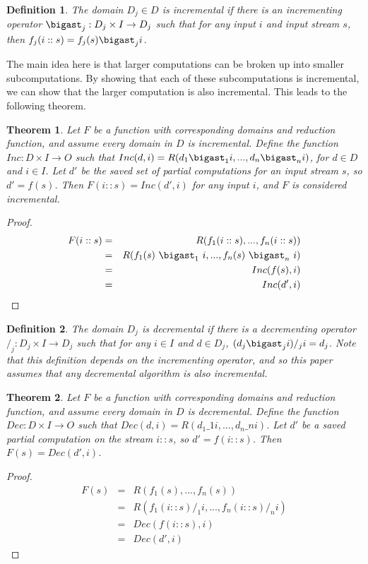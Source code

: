 \documentclass[30pt]{article}
\newtheorem{thm}{Theorem}[section]
\newtheorem{define}{Definition}[section]
\begin{document}
\begin{define}
The domain $D_j \in D$ is \emph{incremental} if there is an incrementing operator $\bigast _j : D_j \times I \rightarrow D_j$ such that for any input $i$ and input stream $s$, then $f_j(i::s) = f_j(s) \bigast_j i$.\\
\end{define}

\indent The main idea here is that larger computations can be broken up into smaller subcomputations. By showing that each of these subcomputations is incremental, we can show that the larger computation is also incremental. This leads to the following theorem. \\

\begin{thm}
Let $F$ be a function with corresponding domains and reduction function, and assume every domain in $D$ is incremental. Define the function $Inc: D \times I \rightarrow O$ such that $Inc(d, i) = R(d_1 \bigast_1 i, ..., d_n \bigast_n i) $, for $d \in D$ and $i \in I$. Let $d'$ be the saved set of partial computations for an input stream $s$, so $d' = f(s)$. Then $F(i::s) = Inc(d', i)$ for any input $i$, and $F$ is considered \emph{incremental}.
\end{thm}
\begin{proof}
\begin{eqnarray*}
F(i::s) & = & R(f_1(i::s), ..., f_n(i::s))\\
& = & R(f_1(s) \mbox{ $\bigast_1$ }  i, ..., f_n(s) \mbox{ $\bigast_n$ } i) \\
& = & Inc(f(s), i)\\
& = & Inc(d', i)
\end{eqnarray*}
\end{proof}


\begin{define}
 The domain $D_j$ is \emph{decremental} if there is a decrementing operator $/_j : D_j \times I \rightarrow D_j $ such that for any $i \in I$ and $d \in D_j$, $(d_j \bigast_j i) /_j i = d_j$. Note that this definition depends on the incrementing operator, and so this paper assumes that any decremental algorithm is also incremental. \\
\end{define}

\begin{thm}
Let $F$ be a function with corresponding domains and reduction function, and assume every domain in $D$ is decremental. Define the function $Dec: D \times I \rightarrow O$ such that $Dec(d, i) = R(d_1 \_1 i, ..., d_n \_n i)$. Let $d'$ be a saved partial computation on the stream $i::s$, so $d' = f(i::s)$. Then $F(s) = Dec(d', i)$. 
\end{thm}
\begin{proof}
\begin{eqnarray*}
F(s) & = & R(f_1(s), ..., f_n(s))\\
& = & R(f_1(i::s) /_1  i, ..., f_n(i::s) /_n i) \\
& = & Dec(f(i::s), i)\\
& = & Dec(d', i)
\end{eqnarray*}
\end{proof}
\end{document}
